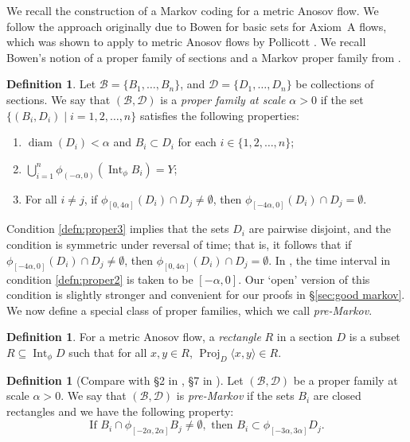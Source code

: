 \documentclass[11pt]{article}
\let\mathcal\mathscr
\let\sep\mid
\theoremstyle{definition}
\newtheorem{defn}[thm]{Definition}
\numberwithin{equation}{section}
\DeclareMathOperator{\diam}{diam}
\DeclareMathOperator{\Int}{Int}
\DeclareMathOperator{\Proj}{Proj}
\newcommand\DDD{\mathcal D}
\newcommand\BBB{\mathcal B}
\begin{document}
We recall the construction of a Markov coding for a metric Anosov flow. We follow the approach originally due to Bowen \cite{bowen-symbolic} for basic sets for Axiom~A flows, which was shown to apply to metric Anosov flows by Pollicott \cite{pollicott}. We recall Bowen's notion of a proper family of sections and a Markov proper family from \cite{bowen-symbolic}.

\begin{defn}\label{defn:proper}
Let $\BBB=\{B_1, \ldots, B_n\}$, and $\DDD=\{D_1, \ldots, D_n\}$ be collections of sections. We say that $(\BBB, \DDD)$ is a \emph{proper family at scale $\alpha>0$} if the set \hbox{$\{ (B_i, D_i) \sep i = 1, 2, \ldots, n \}$} satisfies the following properties:
\begin{enumerate}
\item\label{defn:proper1} $\diam(D_i)< \alpha$ and $B_i \subset D_i$ for each $i \in \{1, 2, \ldots, n\}$;
\item\label{defn:proper2} $\bigcup_{i=1}^n\phi_{(-\alpha, 0)} (\Int_\phi B_i)=Y$;
\item\label{defn:proper3} For all $i\neq j$, if $\phi_{[0, 4\alpha]}(D_i) \cap D_j \neq \emptyset$, then $\phi_{[-4\alpha, 0]}(D_i) \cap D_j = \emptyset$.
\end{enumerate}
\end{defn}

Condition \eqref{defn:proper3} implies that the sets $D_i$ are pairwise disjoint, and the condition is symmetric under reversal of time; that is, it follows that if $\phi_{[-4\alpha, 0]}(D_i) \cap D_j \neq \emptyset$, then $\phi_{[0, 4\alpha]}(D_i) \cap D_j = \emptyset$. In \cite{bowen-symbolic, pollicott}, the time interval in condition \eqref{defn:proper2} is taken to be $[-\alpha, 0]$. Our `open' version of this condition is slightly stronger and convenient for our proofs in \S\ref {sec:good markov}. We now define a special class of proper families, which we call \emph{pre-Markov}.

\begin{defn}\label{def:rectangle}
For a metric Anosov flow, a \emph{rectangle} $R$ in a section $D$ is a subset $R \subseteq \Int_\phi D$ such that for all $x,y \in R$, $\Proj_{D} \langle x,y\rangle \in R$.
\end{defn}

\begin{defn}[Compare with \S 2 in \cite{pollicott}, \S 7 in \cite{bowen-symbolic}]\label{defn:pollicott}
Let $(\BBB, \DDD)$ be a proper family at scale $\alpha>0$. We say that $(\BBB, \DDD)$ is \emph{pre-Markov} if the sets $B_i$ are closed rectangles and we have the following property:
\begin{equation} \label{premarkov}
\mbox{If }B_i \cap \phi_{[-2 \alpha, 2 \alpha]}B_j \neq \emptyset, \mbox{ then } B_i \subset \phi_{[-3\alpha, 3\alpha]} D_j.
\end{equation}
\end{defn}
\end{document}
